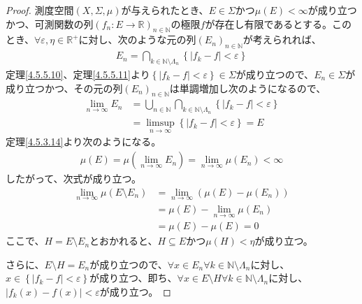 \documentclass[dvipdfmx]{jsarticle}
\begin{document}
\begin{proof}
測度空間$(X,\varSigma,\mu)$が与えられたとき、$E \in \varSigma$かつ$\mu(E) < \infty$が成り立つかつ、可測関数の列$\left( f_{n}:E \rightarrow \mathbb{R} \right)_{n \in \mathbb{N}}$の極限$f$が存在し有限であるとする。このとき、$\forall\varepsilon,\eta \in \mathbb{R}^{+}$に対し、次のような元の列$\left( E_{n} \right)_{n \in \mathbb{N}}$が考えられれば、
\begin{align*}
E_{n} = \bigcap_{k \in \mathbb{N} \setminus \varLambda_{n}} \left\{ \left| f_{k} - f \right| < \varepsilon \right\}
\end{align*}
定理\ref{4.5.5.10}、定理\ref{4.5.5.11}より$\left\{ \left| f_{k} - f \right| < \varepsilon \right\} \in \varSigma$が成り立つので、$E_{n} \in \varSigma$が成り立つかつ、その元の列$\left( E_{n} \right)_{n \in \mathbb{N}}$は単調増加し次のようになるので、
\begin{align*}
\lim_{n \rightarrow \infty}E_{n} &= \bigcup_{n \in \mathbb{N}} {\bigcap_{k \in \mathbb{N} \setminus \varLambda_{n}} \left\{ \left| f_{k} - f \right| < \varepsilon \right\}}\\
&= \limsup_{n \rightarrow \infty}\left\{ \left| f_{k} - f \right| < \varepsilon \right\} = E
\end{align*}
定理\ref{4.5.3.14}より次のようになる。
\begin{align*}
\mu(E) = \mu\left( \lim_{n \rightarrow \infty}E_{n} \right) = \lim_{n \rightarrow \infty}{\mu\left( E_{n} \right)} < \infty
\end{align*}
したがって、次式が成り立つ。
\begin{align*}
\lim_{n \rightarrow \infty}{\mu\left( E \setminus E_{n} \right)} &= \lim_{n \rightarrow \infty}\left( \mu(E) - \mu\left( E_{n} \right) \right)\\
&= \mu(E) - \lim_{n \rightarrow \infty}{\mu\left( E_{n} \right)}\\
&= \mu(E) - \mu(E) = 0
\end{align*}
ここで、$H = E \setminus E_{n}$とおかれると、$H \subseteq E$かつ$\mu(H) < \eta$が成り立つ。\par
さらに、$E \setminus H = E_{n}$が成り立つので、$\forall x \in E_{n}\forall k \in \mathbb{N} \setminus \varLambda_{n}$に対し、$x \in \left\{ \left| f_{k} - f \right| < \varepsilon \right\}$が成り立つ、即ち、$\forall x \in E \setminus H\forall k \in \mathbb{N} \setminus \varLambda_{n}$に対し、$\left| f_{k}(x) - f(x) \right| < \varepsilon$が成り立つ。
\end{proof}
\end{document}
